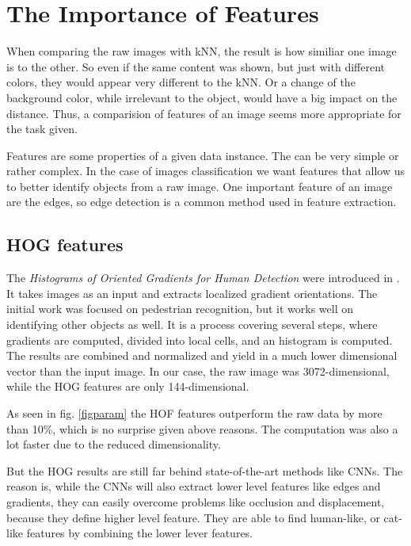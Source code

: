 \section{The Importance of Features} %

When comparing the raw images with kNN, the result is how similiar one image is to the other. So even if the same content was shown, but just with different colors, they would appear very different to the kNN. Or a change of the background color, while irrelevant to the object, would have a big impact on the distance. Thus, a comparision of features of an image seems more appropriate for the task given. 

Features are some properties of a given data instance. The can be very simple or rather complex. In the case of images classification we want features that allow us to better identify objects from a raw image. One important feature of an image are the edges, so edge detection is a common method used in feature extraction. 

\subsection{HOG features}
The \emph{Histograms of Oriented Gradients for Human Detection} were introduced in  \cite{Dalal:2005:HOG:1068507.1069007}. It takes images as an input and extracts localized gradient orientations. The initial work was focused on pedestrian recognition, but it works well on identifying other objects as well. It is a process covering several steps, where gradients are computed, divided into local cells, and an histogram is computed. The results are combined and normalized and yield in a much lower dimensional vector than the input image. In our case, the raw image was 3072-dimensional, while the HOG features are only 144-dimensional. 

As seen in fig. \ref{figparam} the HOF features outperform the raw data by more than 10\%, which is no surprise given above reasons. The computation was also a lot faster due to the reduced dimensionality.

But the HOG results are still far behind state-of-the-art methods like CNNs. The reason is, while the CNNs will also extract lower level features like edges and gradients, they can easily overcome problems like occlusion and displacement, because they define higher level feature. They are able to find human-like, or cat-like features by combining the lower lever features. 


